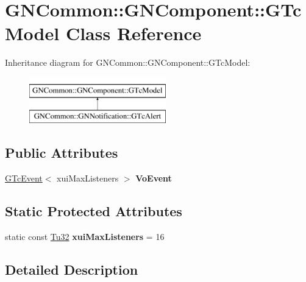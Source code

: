 \hypertarget{class_g_n_common_1_1_g_n_component_1_1_g_tc_model}{}\section{G\+N\+Common\+:\+:G\+N\+Component\+:\+:G\+Tc\+Model Class Reference}
\label{class_g_n_common_1_1_g_n_component_1_1_g_tc_model}
Inheritance diagram for G\+N\+Common\+:\+:G\+N\+Component\+:\+:G\+Tc\+Model\+:\begin{figure}[H]
\begin{center}
\leavevmode
\includegraphics[height=2.000000cm]{class_g_n_common_1_1_g_n_component_1_1_g_tc_model}
\end{center}
\end{figure}
\subsection*{Public Attributes}
\begin{DoxyCompactItemize}
\item 
\mbox{\label{class_g_n_common_1_1_g_n_component_1_1_g_tc_model_a4d953e4b7f0b66c7eabd8ce6c91d120b}} 
\mbox{\hyperlink{class_g_n_common_1_1_g_n_component_1_1_g_tc_event}{G\+Tc\+Event}}$<$ xui\+Max\+Listeners $>$ {\bfseries Vo\+Event}
\end{DoxyCompactItemize}
\subsection*{Static Protected Attributes}
\begin{DoxyCompactItemize}
\item 
\mbox{\label{class_g_n_common_1_1_g_n_component_1_1_g_tc_model_ac1558cfb8f84addcdf0a2fa6457ee760}} 
static const \mbox{\hyperlink{namespace_g_n_common_a941b527ef318f318aed7903dc832b7e4}{Tu32}} {\bfseries xui\+Max\+Listeners} = 16
\end{DoxyCompactItemize}


\subsection{Detailed Description}


